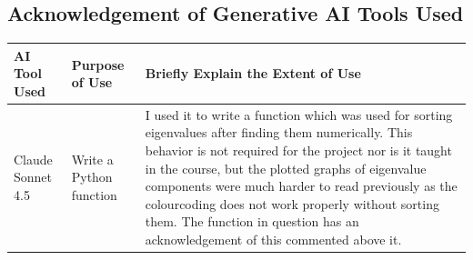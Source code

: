 \documentclass[11pt]{article}
\begin{document}
\begin{center}
\subsection*{Acknowledgement of Generative AI Tools Used}
\begin{tabular}{|m{3cm}|m{3cm}|m{10cm}|}
  \hline
  AI Tool Used & Purpose of Use & Briefly Explain the Extent of Use \\
  \hline
  Claude Sonnet 4.5 & Write a Python function & I used it to write a function which was used for sorting eigenvalues after finding them numerically. This behavior is not required for the project nor is it taught in the course, but the plotted graphs of eigenvalue components were much harder to read previously as the colourcoding does not work properly without sorting them. The function in question has an acknowledgement of this commented above it.\\
  \hline
\end{tabular}

\end{center}
\end{document}
